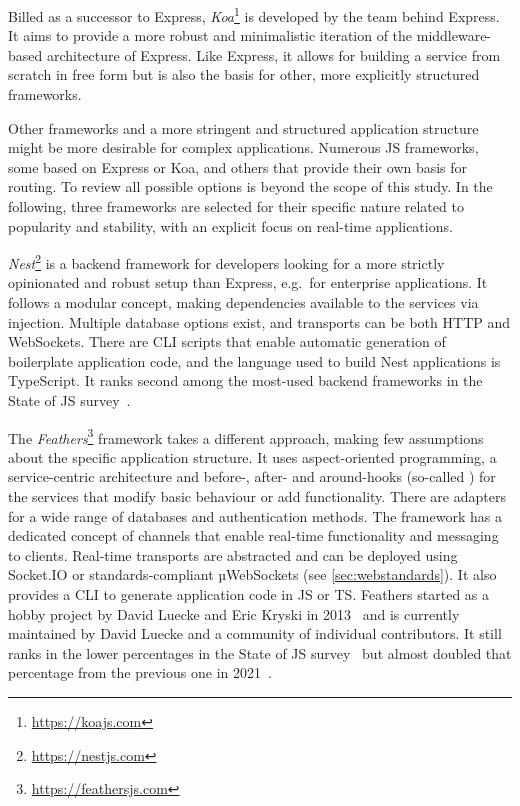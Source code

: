 Billed as a successor to Express, \emph{Koa}\footnote{\url{https://koajs.com}} is developed by the team behind Express.
It aims to provide a more robust and minimalistic iteration of the middleware-based architecture of Express.
Like Express, it allows for building a service from scratch in free form but is also the basis for other, more explicitly structured frameworks.

Other frameworks and a more stringent and structured application structure might be more desirable for complex applications.
Numerous \ac{JS} frameworks, some based on Express or Koa, and others that provide their own basis for routing.
To review all possible options is beyond the scope of this study.
In the following, three frameworks are selected for their specific nature related to popularity and stability, with an explicit focus on real-time applications.



\emph{Nest}\footnote{\url{https://nestjs.com}} is a backend framework for developers looking for a more strictly opinionated and robust setup than Express, e.g.\ for enterprise applications.
It follows a modular concept, making dependencies available to the services via injection.
Multiple database options exist, and transports can be both \ac{HTTP} and WebSockets.
There are \ac{CLI} scripts that enable automatic generation of boilerplate application code, and the language used to build Nest applications is TypeScript.
It ranks second among the most-used backend frameworks in the State of JS survey~\parencite{mostUsedBackendFrameworks22}.

The \emph{Feathers}\footnote{\url{https://feathersjs.com}} framework takes a different approach, making few assumptions about the specific application structure.
It uses aspect-oriented programming, a service-centric architecture and before-, after- and around-hooks (so-called ) for the services that modify basic behaviour or add functionality.
There are adapters for a wide range of databases and authentication methods.
The framework has a dedicated concept of channels that enable real-time functionality and messaging to clients.
Real-time transports are abstracted and can be deployed using Socket.IO or standards-compliant µWebSockets (see \autoref{sec:webstandards}). It also provides a \ac{CLI} to generate application code in \ac{JS} or \ac{TS}.
Feathers started as a hobby project by David Luecke and Eric Kryski in 2013~\parencite{feathersFrameworkHistory} and is currently maintained by David Luecke and a community of individual contributors.
It still ranks in the lower percentages in the State of JS survey~\parencite{mostUsedBackendFrameworks22} but almost doubled that percentage from the previous one in 2021~\parencite{mostUsedBackendFrameworks21}.

